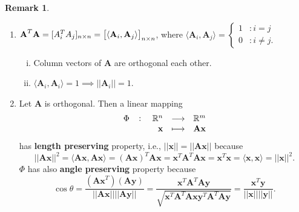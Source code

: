 \documentclass[12pt,openany]{book}
\theoremstyle{definition}
\newtheorem{remark}{Remark}[chapter]
\newcommand{\R}{\mathbb{R}}
\newcommand{\ie}{\textnormal{i.e.}}
\newcommand{\by}{\times}
\newcommand{\inner}[1]{\langle #1\rangle}
\newcommand{\norms}[1]{|| #1||}
\renewcommand{\vec}[1]{\textbf{#1}}
\begin{document}
	\begin{remark}
		\ \begin{enumerate}[(1)]
			\item \(\textbf{A}^T\textbf{A}=[A_i^TA_j]_{n\by n}=\sbr{\inner{\textbf{A}_i,\textbf{A}_j}}_{n\by n}\), where \(\inner{\textbf{A}_i,\textbf{A}_j}=\begin{cases}
				1 &:i=j\\ 0&:i\neq j.
			\end{cases}\)
			\begin{enumerate}[(i)]
				\item Column vectors of \(\textbf{A}\) are orthogonal each other.
				\item \(\inner{\textbf{A}_i,\textbf{A}_i}=1\implies\norms{\textbf{A}_i}=1\).
			\end{enumerate}
			\item Let \(\textbf{A}\) is orthogonal. Then a linear mapping \[
			\fullfunction{\Phi}{\R^n}{\R^m}{\textbf{x}}{\textbf{Ax}}
			\] has \textbf{length preserving} property, \ie, \(\norms{\textbf{x}}=\norms{\textbf{Ax}}\) because \[
			\norms{\textbf{Ax}}^2=\inner{\textbf{Ax},\textbf{Ax}}=(\textbf{Ax})^T\textbf{Ax}=\textbf{x}^T\textbf{A}^T\textbf{Ax}=\textbf{x}^T\textbf{x}=\inner{\textbf{x},\textbf{x}}=\norms{\textbf{x}}^2.
			\] $\Phi$ has also \textbf{angle preserving} property because \[
			\cos\theta=\frac{(\vec{Ax}^T)(\vec{Ay})}{\norms{\vec{Ax}}\norms{\vec{Ay}}}=\frac{\vec{x}^T\textbf{A}^T\textbf{A}\vec{y}}{\sqrt{\textbf{x}^T\textbf{A}^T\textbf{Ax}\textbf{y}^T\textbf{A}^T\textbf{Ay}}}=\frac{\textbf{x}^T\textbf{y}}{\norms{\vec{x}}\norms{\vec{y}}}.
			\]
		\end{enumerate}
	\end{remark}
	
	\newpage
\end{document}
